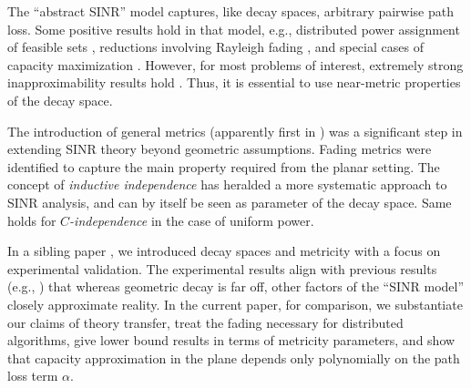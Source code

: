 \documentclass[11pt]{amsart}
\begin{document}
\iffalse On the other hand, allowing for \emph{arbitrary} path loss results in
 computational problems with extremely strong approximation hardness
 results \cite{GHWW09,Hastad}.  This places algorithmic research in the
 quandary of choosing between intractability or lack of fidelity.

\textbf{Future considerations}
\begin{itemize}
\item Temporality: Most likely built on top of a static component 
\item Randomization: Adapting algorithmic models to (the remaining) unpredictability
\medskip

\item Dynamic environments: Only static here; dynamic part is beyond
  scope, it will typically involve static components; hold when environment is not changing.
\end{itemize}
\fi

The ``abstract SINR'' model captures, like decay spaces, arbitrary pairwise path loss. Some positive results hold in that model, e.g., 
distributed power assignment of feasible sets \cite{LotkerPPP11},
reductions involving Rayleigh fading \cite{Dams2012}, and 
special cases of capacity maximization \cite{us:algosensors11}.
However, for most problems of interest, extremely strong inapproximability results hold \cite{GHWW09,khot2006better}. 
Thus, it is essential to use near-metric properties of the decay space.

The introduction of general metrics (apparently first in
\cite{FKV09,FKRV09}) was a significant step in extending SINR theory
beyond geometric assumptions.
Fading metrics \cite{us:talg12} were identified to capture the main
property required from the planar setting.
The concept of \emph{inductive independence} \cite{KV10,hoeferspaa}
has heralded a more systematic approach to SINR analysis, and can by
itself be seen as parameter of the decay space. 
Same holds for \emph{$C$-independence} \cite{infocom11,dams2013sleeping}
in the case of uniform power.

In a sibling paper \cite{us:ICDCS14}, we introduced decay spaces and
metricity with a focus on experimental validation.
The experimental results align with previous results (e.g., 
\cite{son2006,MaheshwariJD2008,chen2010,sevani2012sir}) that
whereas geometric decay is far off, other factors of the ``SINR
model'' closely approximate reality.
In the current paper, for comparison, we substantiate our claims 
of theory transfer, 
treat the fading necessary for distributed algorithms, give lower
bound results in terms of metricity parameters, and show that capacity
approximation in the plane depends only polynomially on the path loss 
term $\alpha$.
\end{document}
